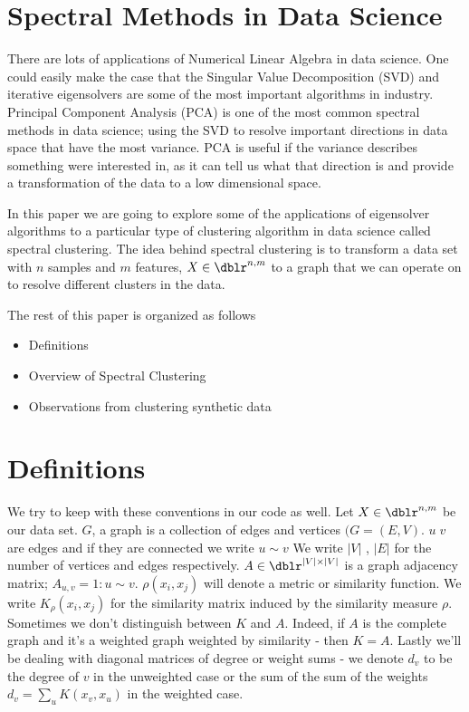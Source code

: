 \section*{Spectral Methods in Data Science}

There are lots of applications of Numerical Linear Algebra in data science. One could easily make the case that the Singular Value Decomposition (SVD) and iterative eigensolvers are some of the most important algorithms in industry. Principal Component Analysis (PCA) is one of the most common spectral methods in data science; using the SVD to resolve important directions in data space that have the most variance. PCA is useful if the variance describes something were interested in, as it can tell us what that direction is and provide a transformation of the data to a low dimensional space.   

In this paper we are going to explore some of the applications of eigensolver algorithms to a particular type of clustering algorithm in data science called spectral clustering. The idea behind spectral clustering is to transform a data set with $n$ samples and $m$ features, $X \in \dblr^{n,m}$ to a graph that we can operate on to resolve different clusters in the data. 

The rest of this paper is organized as follows
\begin{itemize}
\setlength\itemsep{-0.5em}
    \item {Definitions}
    \item {Overview of Spectral Clustering}
    \item {Observations from clustering synthetic data}
\end{itemize}

\section*{Definitions}
We try to keep with these conventions in our code as well. Let $X \in \dblr^{n,m}$ be our data set.  $G$, a graph is a collection of edges and vertices $(G=(E,V)$. $u \; v$ are edges and if they are connected we write $u \sim v$ We write $|V|$ , $|E|$ for the number of vertices and edges respectively. $A \in \dblr^{|V| \times |V| }$ is a graph adjacency matrix; $A_{u,v} = 1 : u \sim v$. $\rho(x_i,x_j)$ will denote a metric or similarity function. We write $K_{\rho}(x_i,x_j)$ for the similarity matrix induced by the similarity measure $\rho$. Sometimes we don't distinguish between $K$ and $A$.  Indeed, if $A$ is the complete graph and it's a weighted graph weighted by similarity - then $K=A$.  Lastly we'll be dealing with diagonal matrices of degree or weight sums - we denote $d_v$ to be the degree of $v$ in the unweighted case or the sum of the sum of the weights $d_v = \sum_{u} K(x_v,x_u)$  in the weighted case.   

